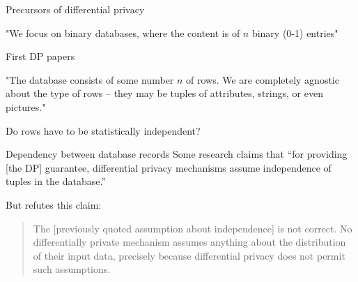 \documentclass[12pt,aspectratio=169,handout]{beamer}
\begin{document}
\begin{frame}{Precursors of differential privacy}

"We focus on binary databases, where the content is of $n$ binary (0-1) entries"


\end{frame}



\begin{frame}{First DP papers}

"The database consists of some number $n$ of rows. We are completely agnostic about the type of rows – they may be tuples of attributes, strings, or even pictures."

\end{frame}


\begin{frame}{Do rows have to be statistically independent?}


\begin{block}{Dependency between database records}
Some research claims that ``for providing [the DP] guarantee, differential privacy mechanisms assume independence of tuples in the database.''
\end{block}

But \citet{McSherry.2016.blog} refutes this claim:

\bigskip

\begin{quotation}
The [previously quoted assumption about independence] is not correct. No differentially
private mechanism assumes anything about the distribution of their input data, precisely
because differential privacy does not permit such assumptions.
\end{quotation}

\end{frame}
\end{document}
